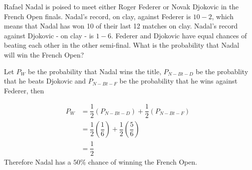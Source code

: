 
%
%
%
%
% 
% 

\question Rafael Nadal is poised to meet either Roger Federer or Novak 
Djokovic in the French Open finals. Nadal's record, on clay, against Federer is 
$10-2$, which means that Nadal has won 10 of their last 12 matches on clay. Nadal's 
record against Djokovic - on clay - is $1-6$. Federer and Djokovic have equal chances of
beating each other in the other semi-final. What is the probability that Nadal will win 
the French Open? 

\insertQR{}

\ifprintanswers
\fi 

\begin{solution}
  Let $P_{W}$ be the probability that Nadal wins the title, 
$P_{N-Bt-D}$ be the probablity that he beats Djokovic and $P_{N-Bt-F}$  
be the probability that he wins against Federer, then 
   
  \begin{align}
    P_{W} &= \dfrac{1}{2}(P_{N-Bt-D}) + \dfrac{1}{2}(P_{N-Bt-F}) \\
   	  &= \dfrac{1}{2}(\dfrac{1}{6}) + \dfrac{1}{2}(\dfrac{5}{6}) \\ 
   	  &= \dfrac{1}{2}
  \end{align}
  Therefore Nadal has a $50\%$ chance of winning the French Open.     
\end{solution}
